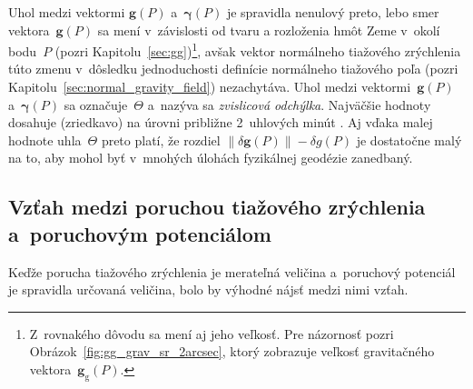 \documentclass[a4paper,12pt]{book}
\newcommand{\gidx}{\mathrm g}
\let\vec\mathbf
\begin{document}
Uhol medzi vektormi $\vec g(P)$ a~$\boldsymbol{\gamma}(P)$ je spravidla 
nenulový preto, lebo smer vektora~$\vec g(P)$ sa mení v~závislosti od tvaru 
a rozloženia hmôt Zeme v~okolí bodu~$P$ (pozri 
Kapitolu~\ref{sec:gg})\footnote{Z~rovnakého dôvodu sa mení aj jeho veľkosť.  
Pre názornosť pozri Obrázok~\ref{fig:gg_grav_sr_2arcsec}, ktorý zobrazuje 
veľkosť gravitačného vektora~$\vec g_\gidx(P)$.}, avšak vektor normálneho 
tiažového zrýchlenia túto zmenu v~dôsledku jednoduchosti definície normálneho 
tiažového poľa (pozri Kapitolu~\ref{sec:normal_gravity_field}) nezachytáva.  
Uhol medzi vektormi~$\vec g(P)$ a~$\boldsymbol \gamma(P)$ sa označuje~$\Theta$ 
a~nazýva sa \emph{zvislicová odchýlka}.  Najväčšie hodnoty dosahuje (zriedkavo) 
na úrovni približne 2~uhlových minút \parencite{GGMplus}.  Aj vďaka malej 
hodnote uhla~$\Theta$ preto platí, že rozdiel $\| \delta \vec g(P) \| - \delta 
g(P)$ je dostatočne malý na to, aby mohol byť v~mnohých úlohách fyzikálnej 
geodézie zanedbaný.


\subsection{Vzťah medzi poruchou tiažového zrýchlenia a~poruchovým potenciálom}

Keďže porucha tiažového zrýchlenia je merateľná veličina a~poruchový potenciál 
je spravidla určovaná veličina, bolo by výhodné nájsť medzi nimi vzťah.
\end{document}
